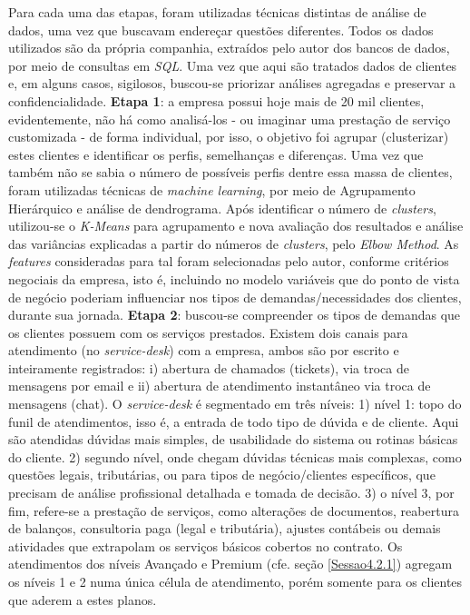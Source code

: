 \documentclass[twocolumn]{rbef}
\newcommand{\1}{\mathbbm{1}}
\begin{document}
Para cada uma das etapas, foram utilizadas técnicas distintas de análise de dados, uma vez que buscavam endereçar questões diferentes.
Todos os dados utilizados são da própria companhia, extraídos pelo autor dos bancos de dados, por meio de consultas em \emph{SQL}. Uma vez que aqui são tratados dados de clientes e, em alguns casos, sigilosos, buscou-se priorizar análises agregadas e preservar a confidencialidade.
\newline\textbf{Etapa 1}: a empresa possui hoje mais de 20 mil clientes, evidentemente, não há como analisá-los - ou imaginar uma prestação de serviço customizada - de forma individual, por isso, o objetivo foi agrupar (clusterizar) estes clientes e identificar os perfis, semelhanças e diferenças. Uma vez que também não se sabia o número de possíveis perfis dentre essa massa de clientes, foram utilizadas técnicas de \emph{machine learning}, por meio de Agrupamento Hierárquico e análise de dendrograma. Após identificar o número de \emph{clusters}, utilizou-se o \emph{K-Means} para agrupamento e nova avaliação dos resultados e análise das variâncias explicadas a partir do números de \emph{clusters}, pelo \emph{Elbow Method}. As \emph{features} consideradas para tal foram selecionadas pelo autor, conforme critérios negociais da empresa, isto é, incluindo no modelo variáveis que do ponto de vista de negócio poderiam influenciar nos tipos de demandas/necessidades dos clientes, durante sua jornada.
\newline\textbf{Etapa 2}: buscou-se compreender os tipos de demandas que os clientes possuem com os serviços prestados. Existem dois canais para atendimento (no \emph{service-desk}) com a empresa, ambos são por escrito e inteiramente registrados: i) abertura de chamados (tickets), via troca de mensagens por email e ii) abertura de atendimento instantâneo via troca de mensagens (chat).
O \emph{service-desk} é segmentado em três níveis: 1) nível 1: topo do funil de atendimentos, isso é, a entrada de todo tipo de dúvida e de cliente. Aqui são atendidas dúvidas mais simples, de usabilidade do sistema ou rotinas básicas do cliente. 2) segundo nível, onde chegam dúvidas técnicas mais complexas, como questões legais, tributárias, ou para tipos de negócio/clientes específicos, que precisam de análise profissional detalhada e tomada de decisão. 3) o nível 3, por fim, refere-se a prestação de serviços, como alterações de documentos, reabertura de balanços, consultoria paga (legal e tributária), ajustes contábeis ou demais atividades que extrapolam os serviços básicos cobertos no contrato. Os atendimentos dos níveis Avançado e Premium (cfe. seção \ref{Sessao4.2.1}) agregam os níveis 1 e 2 numa única célula de atendimento, porém somente para os clientes que aderem a estes planos.
\end{document}
